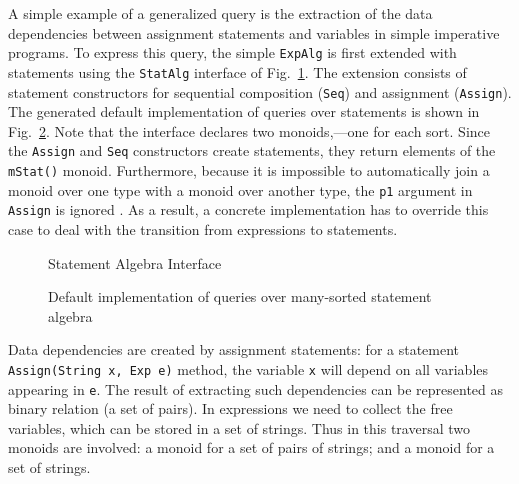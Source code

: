 A simple example of a generalized query is the extraction of the data
dependencies between assignment statements and variables in simple
imperative programs.  To express this query, the simple
\lstinline{ExpAlg} is first extended with statements using the
\lstinline{StatAlg} interface of Fig.~\ref{statalg}.  The extension
consists of statement constructors for sequential composition
(\lstinline{Seq}) and assignment (\lstinline{Assign}).  The generated
default implementation of queries over statements is shown in
Fig.~\ref{LST:gstatquery}.  Note that the interface declares two
monoids,---one for each sort.  Since the \lstinline{Assign} and
\lstinline{Seq} constructors create statements, they return elements
of the \lstinline{mStat()} monoid.  Furthermore, because it is
impossible to automatically join a monoid over one type with a monoid
over another type, the \lstinline{p1} argument in \lstinline{Assign}
is ignored .  As a result, a
concrete implementation has to override this case to deal with the
transition from expressions to statements.

\begin{figure}[t]
\vspace{-.1in}
\caption{Statement Algebra Interface}
\label{statalg}
\end{figure}


\begin{figure}[t]
\vspace{-.1in}
\caption{Default implementation of queries over many-sorted statement algebra}
\label{LST:gstatquery}
\end{figure}



Data dependencies are created by assignment statements: for a
statement \lstinline{Assign(String x, Exp e)} method, the variable
\lstinline{x} will depend on all variables appearing in \lstinline{e}.
The result of extracting such dependencies can be represented as
binary relation (a set of pairs). In expressions we need to collect
the free variables, which can be stored in a set of strings.  Thus in
this traversal two monoids are involved: a monoid for a set of pairs
of strings; and a monoid for a set of strings.

